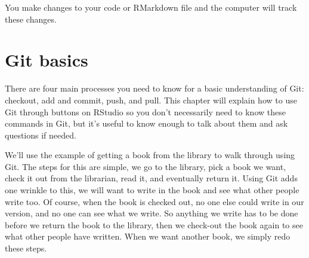 \documentclass[
  12pt,
]{book}
\begin{document}
You make changes to your code or RMarkdown file and the computer will track these changes.

\hypertarget{git-basics}{%
\section{Git basics}\label{git-basics}}

There are four main processes you need to know for a basic understanding of Git: checkout, add and commit, push, and pull. This chapter will explain how to use Git through buttons on RStudio so you don't necessarily need to know these commands in Git, but it's useful to know enough to talk about them and ask questions if needed.

We'll use the example of getting a book from the library to walk through using Git. The steps for this are simple, we go to the library, pick a book we want, check it out from the librarian, read it, and eventually return it. Using Git adds one wrinkle to this, we will want to write in the book and see what other people write too. Of course, when the book is checked out, no one else could write in our version, and no one can see what we write. So anything we write has to be done before we return the book to the library, then we check-out the book again to see what other people have written. When we want another book, we simply redo these steps.
\end{document}
